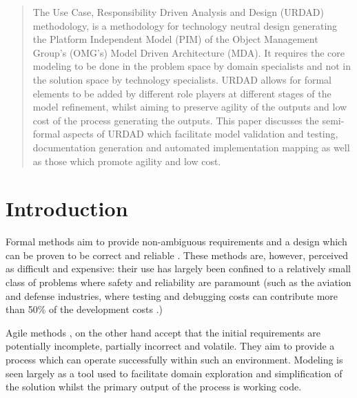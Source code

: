 \date{Received: \today / Accepted: date}

\maketitle

\begin{abstract}
The Use Case, Responsibility Driven Analysis and Design (URDAD) methodology, is
a methodology for technology neutral design generating the Platform Independent
Model (PIM) of the Object Management Group's (OMG's) Model Driven Architecture (MDA).
It requires the core modeling to be done in the problem space by
domain specialists and not in the solution space by technology specialists.
URDAD allows for formal elements to be
added by different role players at different stages of the model refinement,
whilst aiming to preserve agility of the outputs and low cost of the process
generating the outputs.
This paper discusses the semi-formal aspects of URDAD
which facilitate model validation and testing, documentation
generation and automated implementation mapping as well as those
which promote agility and low cost.
\end{abstract}

\section{Introduction}
\label{sec:introduction}
Formal methods aim to provide non-ambiguous requirements and a design
which can be proven to be correct and reliable \cite{Monin:understandingFormalMethods}.
These methods are, however, perceived as difficult and expensive: their
use has largely been confined to a relatively small class of problems
where safety and reliability are paramount (such as the aviation \cite{hall:formalMethodsInRealAirTraffic}
and defense industries, where testing and debugging costs can contribute more
than 50\% of the development costs
\cite{platzer:verificationOfCyberphysicalTransportationSystems}.)

Agile methods \cite{agileManifesto,martin:agileSoftwareDevelopment},
on the other hand accept that the initial requirements are potentially
incomplete, partially incorrect and volatile. They aim to provide a process which
can operate successfully within such an environment. Modeling is seen
largely as a tool used to facilitate domain exploration and simplification
of the solution whilst the primary output of the process is working code.

